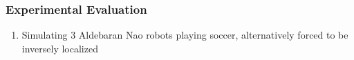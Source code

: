 \begin{frame}
	\frametitle{Experimental Evaluation}
	
	\Large
	
	\vspace{-0.94cm}
	
	\begin{enumerate}
		\conti
		
		\item Simulating 3 Aldebaran Nao robots playing soccer, alternatively forced to be
			  inversely localized
		
		\seti
	\end{enumerate}
	
	\vspace{-0.8cm}
	
	\begin{columns}[T]
		
	\begin{figure}
		\centering
		

\end{figure}
\end{columns}
\end{frame}

